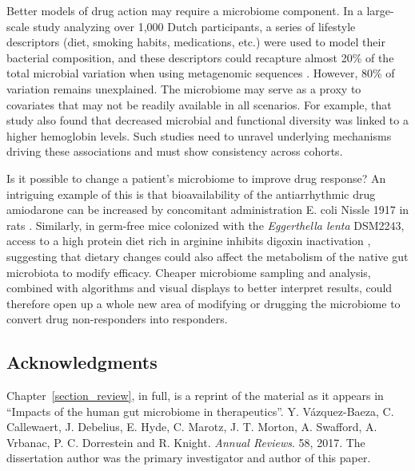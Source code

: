 Better models of drug action may require a microbiome component. In a large-scale study analyzing over 1,000 Dutch participants, a series of lifestyle descriptors (diet, smoking habits, medications, etc.) were used to model their bacterial composition, and these descriptors could recapture almost 20\% of the total microbial variation when using metagenomic sequences \cite{RN4059}. However, 80\% of variation remains unexplained. The microbiome may serve as a proxy to covariates that may not be readily available in all scenarios. For example, that study also found that decreased microbial and functional diversity was linked to a higher hemoglobin levels. Such studies need to unravel underlying mechanisms driving these associations and must show consistency across cohorts. 

Is it possible to change a patient's microbiome to improve drug response?  An 
intriguing example of this is that bioavailability of the antiarrhythmic drug 
amiodarone can be increased by concomitant administration E. coli Nissle 1917 
in rats \cite{RN4086, RN4201}. Similarly, in germ-free mice colonized with the 
\textit{Eggerthella lenta} DSM2243, access to a high protein diet rich in 
arginine inhibits digoxin inactivation \cite{RN4102, RN4202}, suggesting that 
dietary changes could also affect the metabolism of the native gut microbiota 
to modify efficacy. Cheaper microbiome sampling and analysis, combined with 
algorithms and visual displays to better interpret results, could therefore 
open up a whole new area of modifying or drugging the microbiome to convert 
drug non-responders into responders.

\subsection{Acknowledgments}

Chapter~\ref{section_review}, in full, is a reprint of the material as it 
appears in ``Impacts of the human gut microbiome in therapeutics''. Y.  
V\'azquez-Baeza, C. Callewaert, J. Debelius, E. Hyde, C.  Marotz, J. T.  
Morton, A. Swafford, A. Vrbanac, P. C.  Dorrestein and R.  Knight.  
\emph{Annual Reviews}. 58, 2017. The dissertation author was the primary 
investigator and author of this paper.

